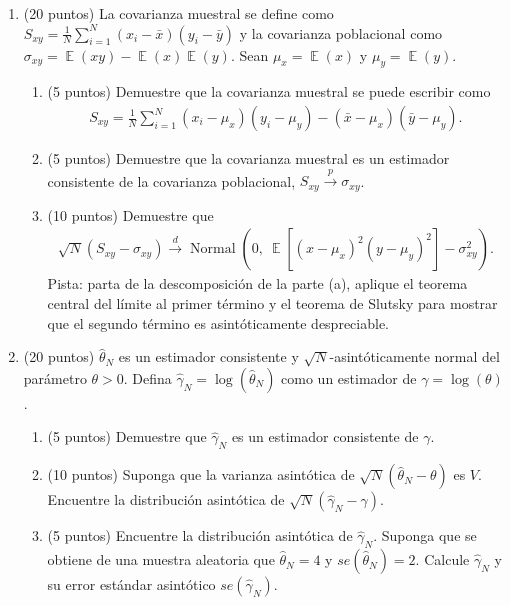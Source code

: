 \documentclass[letterpaper,11pt]{article}
\theoremstyle{plain}
\theoremstyle{definition}
\theoremstyle{remark}
\DeclareMathOperator{\E}{\mathbb{E}}
\newcommand{\pto}{\stackrel{p}{\longrightarrow}}
\newcommand{\dto}{\stackrel{d}{\longrightarrow}}
\DeclareMathOperator{\N}{Normal}
\begin{document}
\begin{enumerate}
    \item (20 puntos) La covarianza muestral se define como
        $S_{x y}=\frac{1}{N} \sum_{i=1}^N (x_i-\bar x) (y_i-\bar y)$ y la covarianza poblacional
        como $\sigma_{xy}=\E(xy)-\E(x)\E(y)$. Sean $\mu_x=\E(x)$ y $\mu_y=\E(y)$.
        \begin{enumerate}
            \item (5 puntos) Demuestre que la covarianza muestral se puede escribir como
                \begin{align*}
                S_{x y}=\frac{1}{N} \sum_{i=1}^N (x_i-\mu_x)(y_i-\mu_y)-(\bar x-\mu_x) (\bar y-\mu_y).
                \end{align*}
            \item (5 puntos) Demuestre que la covarianza muestral es un estimador consistente de
                la covarianza poblacional, $S_{x y}\pto \sigma_{xy}$.
            \item (10 puntos) Demuestre que
                \begin{align*}
                \sqrt{N}(S_{x y}-\sigma_{x y})\dto \N\left(0,\ \E[(x-\mu_x)^2 (y-\mu_y)^2]-\sigma_{xy}^2\right).
                \end{align*}
                Pista: parta de la descomposici\'on de la parte (a), aplique el teorema central
                del l\'imite al primer t\'ermino y el teorema de Slutsky para mostrar que el
                segundo t\'ermino es asint\'oticamente despreciable.
        \end{enumerate}

    \item (20 puntos) $\hat \theta_N$ es un estimador consistente y
        $\sqrt{N}$-asint\'oticamente normal del par\'ametro $\theta>0$. Defina
        $\hat \gamma_N=\log(\hat \theta_N)$ como un estimador de $\gamma=\log(\theta)$.
        \begin{enumerate}
            \item (5 puntos) Demuestre que $\hat \gamma_N$ es un estimador consistente de $\gamma$.
            \item (10 puntos) Suponga que la varianza asint\'otica de
                $\sqrt{N}(\hat \theta_N-\theta)$ es $V$. Encuentre la distribuci\'on asint\'otica
                de $\sqrt{N}(\hat \gamma_N-\gamma)$.
            \item (5 puntos) Encuentre la distribuci\'on asint\'otica de $\hat \gamma_N$. Suponga
                que se obtiene de una muestra aleatoria que $\hat \theta_N=4$ y
                $se(\hat \theta_N)=2$. Calcule $\hat \gamma_N$ y su error est\'andar
                asint\'otico $se(\hat \gamma_N)$.
        \end{enumerate}


\end{enumerate}
\end{document}
